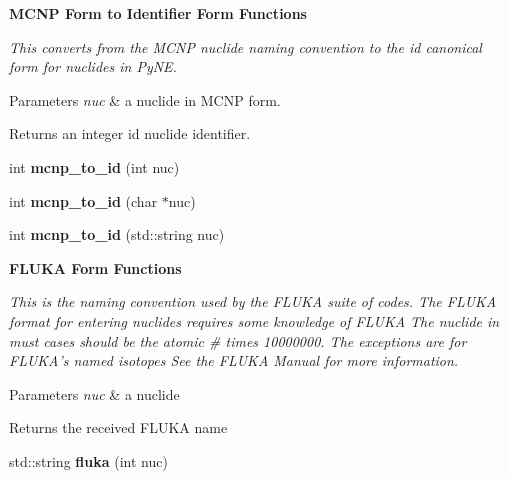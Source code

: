 \begin{Indent}{\bf M\+C\+N\+P Form to Identifier Form Functions}\par
{\em This converts from the M\+C\+N\+P nuclide naming convention to the id canonical form for nuclides in Py\+N\+E. 
\begin{DoxyParams}{Parameters}
{\em nuc} & a nuclide in M\+C\+N\+P form. \\
\hline
\end{DoxyParams}
\begin{DoxyReturn}{Returns}
an integer id nuclide identifier. 
\end{DoxyReturn}
}\begin{DoxyCompactItemize}
\item 
\hypertarget{namespacepyne_1_1nucname_a08a6a5c718cf9f473ec04fea4f3d8136}{int {\bfseries mcnp\+\_\+to\+\_\+id} (int nuc)}\label{namespacepyne_1_1nucname_a08a6a5c718cf9f473ec04fea4f3d8136}

\item 
\hypertarget{namespacepyne_1_1nucname_ad3c98c31ea9887ba2cccc0e5435fe7eb}{int {\bfseries mcnp\+\_\+to\+\_\+id} (char $\ast$nuc)}\label{namespacepyne_1_1nucname_ad3c98c31ea9887ba2cccc0e5435fe7eb}

\item 
\hypertarget{namespacepyne_1_1nucname_a9dfc39f06bbb535cb9df3bc06a1211ff}{int {\bfseries mcnp\+\_\+to\+\_\+id} (std\+::string nuc)}\label{namespacepyne_1_1nucname_a9dfc39f06bbb535cb9df3bc06a1211ff}

\end{DoxyCompactItemize}
\end{Indent}
\begin{Indent}{\bf F\+L\+U\+K\+A Form Functions}\par
{\em This is the naming convention used by the F\+L\+U\+K\+A suite of codes. The F\+L\+U\+K\+A format for entering nuclides requires some knowledge of F\+L\+U\+K\+A The nuclide in must cases should be the atomic \# times 10000000. The exceptions are for F\+L\+U\+K\+A's named isotopes See the F\+L\+U\+K\+A Manual for more information. 
\begin{DoxyParams}{Parameters}
{\em nuc} & a nuclide \\
\hline
\end{DoxyParams}
\begin{DoxyReturn}{Returns}
the received F\+L\+U\+K\+A name 
\end{DoxyReturn}
}\begin{DoxyCompactItemize}
\item 
\hypertarget{namespacepyne_1_1nucname_ac34443f2c05ca8fda7d7993e715a3f5a}{std\+::string {\bfseries fluka} (int nuc)}\label{namespacepyne_1_1nucname_ac34443f2c05ca8fda7d7993e715a3f5a}

\end{DoxyCompactItemize}
\end{Indent}
